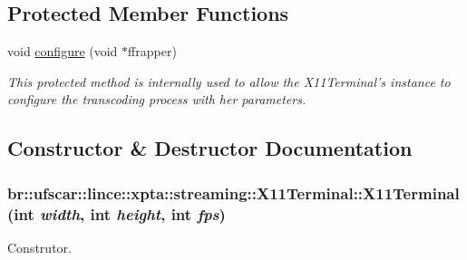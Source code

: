 \subsection*{Protected Member Functions}
\begin{DoxyCompactItemize}
\item 
void \hyperlink{classbr_1_1ufscar_1_1lince_1_1xpta_1_1streaming_1_1X11Terminal_af41a852e18a8d9fa64202eb12f2dfb12}{configure} (void $\ast$ffrapper)
\begin{DoxyCompactList}\small\item\em This protected method is internally used to allow the X11Terminal's instance to configure the transcoding process with her parameters. \item\end{DoxyCompactList}\end{DoxyCompactItemize}


\subsection{Constructor \& Destructor Documentation}
\hypertarget{classbr_1_1ufscar_1_1lince_1_1xpta_1_1streaming_1_1X11Terminal_a7110a4bae4314923d06f0717b6700ba3}{
\subsubsection[{X11Terminal}]{\setlength{\rightskip}{0pt plus 5cm}br::ufscar::lince::xpta::streaming::X11Terminal::X11Terminal (int {\em width}, \/  int {\em height}, \/  int {\em fps})}}
\label{classbr_1_1ufscar_1_1lince_1_1xpta_1_1streaming_1_1X11Terminal_a7110a4bae4314923d06f0717b6700ba3}


Construtor. 


